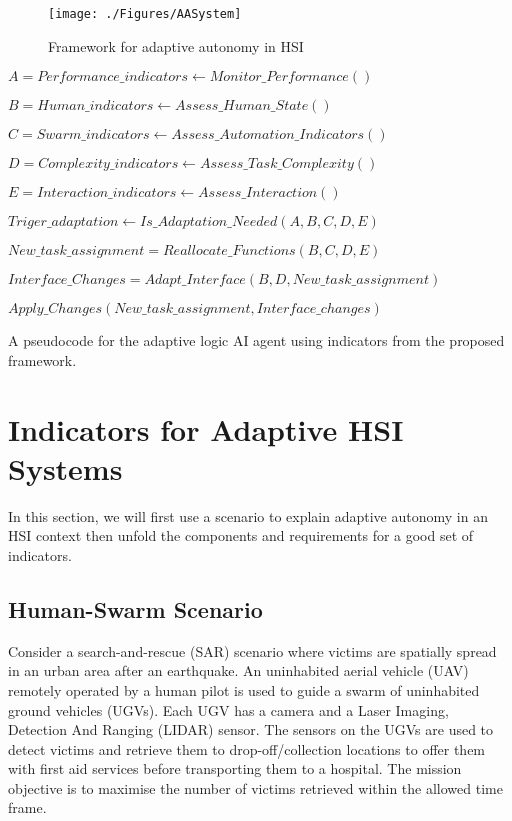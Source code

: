 \documentclass[journal]{IEEEtran}
\begin{document}
\begin{figure*}[ht!]
\centering
\texttt{[image: ./Figures/AASystem]}
\caption{Framework for adaptive autonomy in HSI}
\centering \label{fig:framework}
\end{figure*}

\begin{algorithm*}
\centering
\begin{algorithmic}%

\State $A = Performance\_indicators \leftarrow Monitor\_Performance()$

\State $B = Human\_indicators \leftarrow Assess\_Human\_State()$

\State $C = Swarm\_indicators \leftarrow Assess\_Automation\_Indicators()$

\State $D = Complexity\_indicators \leftarrow Assess\_Task\_Complexity()$

\State $E = Interaction\_indicators \leftarrow Assess\_Interaction() $

\State $ Triger\_adaptation \leftarrow Is\_Adaptation\_Needed(A,B,C,D,E)$

\State $New\_task\_assignment = Reallocate\_Functions(B,C,D,E)$

\State$Interface\_Changes= Adapt\_Interface(B,D,New\_task\_assignment)$

\State $Apply\_Changes(New\_task\_assignment, Interface\_changes)$

\EndIf
\EndWhile
\end{algorithmic}
\caption{A pseudocode for the adaptive logic AI agent using indicators from the proposed framework.}
\label{algo}
\end{algorithm*}

\section{Indicators for Adaptive HSI Systems}\label{indicators}
In this section, we will first use a scenario to explain adaptive autonomy in an HSI context then unfold the components and requirements for a good set of indicators.

\subsection{Human-Swarm Scenario} \label{scenario}

Consider a search-and-rescue (SAR) scenario where victims are spatially spread in an urban area after an earthquake. An uninhabited aerial vehicle (UAV) remotely operated by a human pilot is used to guide a swarm of uninhabited ground vehicles (UGVs). Each UGV has a camera and a Laser Imaging, Detection And Ranging (LIDAR) sensor. The sensors on the UGVs are used to detect victims and retrieve them to drop-off/collection locations to offer them with first aid services before transporting them to a hospital. The mission objective is to maximise the number of victims retrieved within the allowed time frame.  
\end{document}
